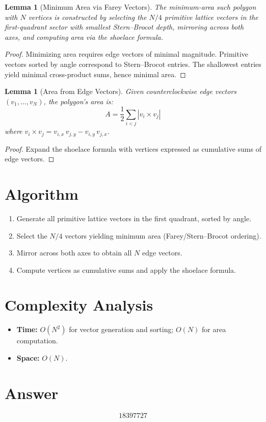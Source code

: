 \documentclass[11pt]{article}
\newtheorem{lemma}[theorem]{Lemma}
\theoremstyle{definition}
\begin{document}
\begin{lemma}[Minimum Area via Farey Vectors]
The minimum-area such polygon with $N$ vertices is constructed by selecting the $N/4$ primitive lattice vectors in the first-quadrant sector with smallest Stern--Brocot depth, mirroring across both axes, and computing area via the shoelace formula.
\end{lemma}

\begin{proof}
Minimizing area requires edge vectors of minimal magnitude. Primitive vectors sorted by angle correspond to Stern--Brocot entries. The shallowest entries yield minimal cross-product sums, hence minimal area.
\end{proof}

\begin{lemma}[Area from Edge Vectors]
Given counterclockwise edge vectors $(v_1, \ldots, v_N)$, the polygon's area is:
\[
A = \frac{1}{2}\sum_{i < j} |v_i \times v_j|
\]
where $v_i \times v_j = v_{i,x}\,v_{j,y} - v_{i,y}\,v_{j,x}$.
\end{lemma}

\begin{proof}
Expand the shoelace formula with vertices expressed as cumulative sums of edge vectors.
\end{proof}

\section{Algorithm}

\begin{enumerate}
\item Generate all primitive lattice vectors in the first quadrant, sorted by angle.
\item Select the $N/4$ vectors yielding minimum area (Farey/Stern--Brocot ordering).
\item Mirror across both axes to obtain all $N$ edge vectors.
\item Compute vertices as cumulative sums and apply the shoelace formula.
\end{enumerate}

\section{Complexity Analysis}

\begin{itemize}
\item \textbf{Time:} $O(N^2)$ for vector generation and sorting; $O(N)$ for area computation.
\item \textbf{Space:} $O(N)$.
\end{itemize}

\section{Answer}

\[
\boxed{18397727}
\]
\end{document}
